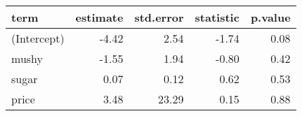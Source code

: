 \begin{tabular}{lrrrr}
  \hline
term & estimate & std.error & statistic & p.value \\ 
  \hline
(Intercept) & -4.42 & 2.54 & -1.74 & 0.08 \\ 
  mushy & -1.55 & 1.94 & -0.80 & 0.42 \\ 
  sugar & 0.07 & 0.12 & 0.62 & 0.53 \\ 
  price & 3.48 & 23.29 & 0.15 & 0.88 \\ 
   \hline
\end{tabular}
